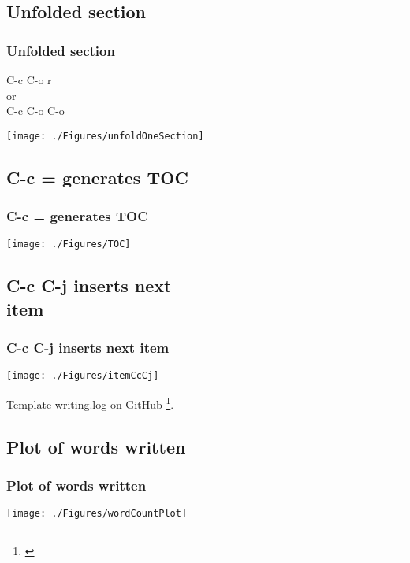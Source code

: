 \documentclass{beamer}
\begin{document}
\subsection{Unfolded section}
\begin{frame}
\frametitle{Unfolded section}
C-c C-o r \\
or \\
C-c C-o C-o \\
\begin{center}
    \texttt{[image: ./Figures/unfoldOneSection]}
\end{center}
\end{frame}


\subsection{C-c = generates TOC}
\begin{frame}
\frametitle{C-c = generates TOC}
\begin{center}
    \texttt{[image: ./Figures/TOC]}
\end{center}
\end{frame}
\note{}


\subsection{C-c C-j inserts next \\item}
\begin{frame}
\frametitle{C-c C-j inserts next item}
\begin{center}
    \texttt{[image: ./Figures/itemCcCj]}
\end{center}
Template writing.log on GitHub \footnote{\url{}}.
\end{frame}
\note{}


\subsection{Plot of words written}
\begin{frame}
\frametitle{Plot of words written}
\begin{center}
\begin{center}
    \texttt{[image: ./Figures/wordCountPlot]}
\end{center}
\end{center}
\end{frame}
\note{}
\end{document}
